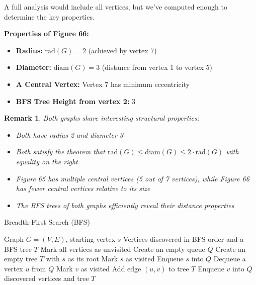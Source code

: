 \documentclass{article}
\newtheorem{remark}{Remark}
\theoremstyle{definition}
\begin{document}
\noindent A full analysis would include all vertices, but we've computed enough to determine the key properties.

\noindent\textbf{Properties of Figure 66:}
\begin{itemize}
\item \textbf{Radius:} $\text{rad}(G) = 2$ (achieved by vertex 7)
\item \textbf{Diameter:} $\text{diam}(G) = 3$ (distance from vertex 1 to vertex 5)
\item \textbf{A Central Vertex:} Vertex 7 has minimum eccentricity
\item \textbf{BFS Tree Height from vertex 2:} 3
\end{itemize}
\pagebreak

\begin{remark}
Both graphs share interesting structural properties:
\begin{itemize}
\item Both have radius 2 and diameter 3
\item Both satisfy the theorem that $\text{rad}(G) \leq \text{diam}(G) \leq 2 \cdot \text{rad}(G)$ with equality on the right
\item Figure 65 has multiple central vertices (5 out of 7 vertices), while Figure 66 has fewer central vertices relative to its size
\item The BFS trees of both graphs efficiently reveal their distance properties
\end{itemize}
\end{remark}

\begin{algorithm}
\caption{Breadth-First Search (BFS)}
\begin{algorithmic}[1]
\Require Graph $G = (V, E)$, starting vertex $s$
\Ensure Vertices discovered in BFS order and a BFS tree $T$
    \State Mark all vertices as unvisited
    \State Create an empty queue $Q$
    \State Create an empty tree $T$ with $s$ as its root
    \State Mark $s$ as visited
    \State Enqueue $s$ into $Q$
        \State Dequeue a vertex $u$ from $Q$
                \State Mark $v$ as visited
                \State Add edge $(u,v)$ to tree $T$
                \State Enqueue $v$ into $Q$
            \EndIf
        \EndFor
    \EndWhile
    \State \Return discovered vertices and tree $T$
\EndProcedure
\end{algorithmic}
\end{algorithm}
\end{document}
